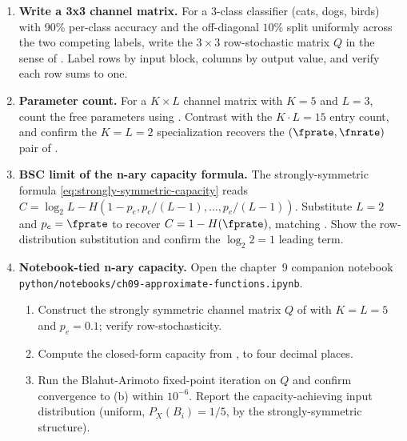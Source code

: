 \begin{enumerate}


\item \exstar
\label{ex:ch9-1}
\textbf{Write a 3x3 channel matrix.}
For a 3-class classifier (cats, dogs, birds) with 90\% per-class
accuracy and the off-diagonal $10\%$ split uniformly across the
two competing labels, write the $3 \times 3$ row-stochastic
matrix $Q$ in the sense of . Label rows
by input block, columns by output value, and verify each row
sums to one.

\item \exstar
\label{ex:ch9-2}
\textbf{Parameter count.}
For a $K \times L$ channel matrix with $K = 5$ and $L = 3$,
count the free parameters using .
Contrast with the $K \cdot L = 15$ entry count, and confirm the
$K = L = 2$ specialization recovers the $(\fprate, \fnrate)$
pair of .

\item \exstar
\label{ex:ch9-3}
\textbf{BSC limit of the n-ary capacity formula.}
The strongly-symmetric formula \eqref{eq:strongly-symmetric-capacity}
reads $C = \log_2 L - H(1 - p_e, p_e / (L - 1), \ldots,
p_e / (L - 1))$. Substitute $L = 2$ and $p_e = \fprate$ to
recover $C = 1 - H(\fprate)$, matching .
Show the row-distribution substitution and confirm the
$\log_2 2 = 1$ leading term.


\item \exstarstar
\label{ex:ch9-4}
\textbf{Notebook-tied n-ary capacity.}
Open the chapter~9 companion notebook
\texttt{python/notebooks/ch09-approximate-functions.ipynb}.
\begin{enumerate}
  \item[(a)] Construct the strongly symmetric channel matrix $Q$
    of  with $K = L = 5$ and $p_e =
    0.1$; verify row-stochasticity.
  \item[(b)] Compute the closed-form capacity from
    , to four decimal places.
  \item[(c)] Run the Blahut-Arimoto fixed-point iteration on $Q$
    and confirm convergence to (b) within $10^{-6}$. Report the
    capacity-achieving input distribution (uniform, $P_X(B_i) =
    1/5$, by the strongly-symmetric structure).
\end{enumerate}


\end{enumerate}
